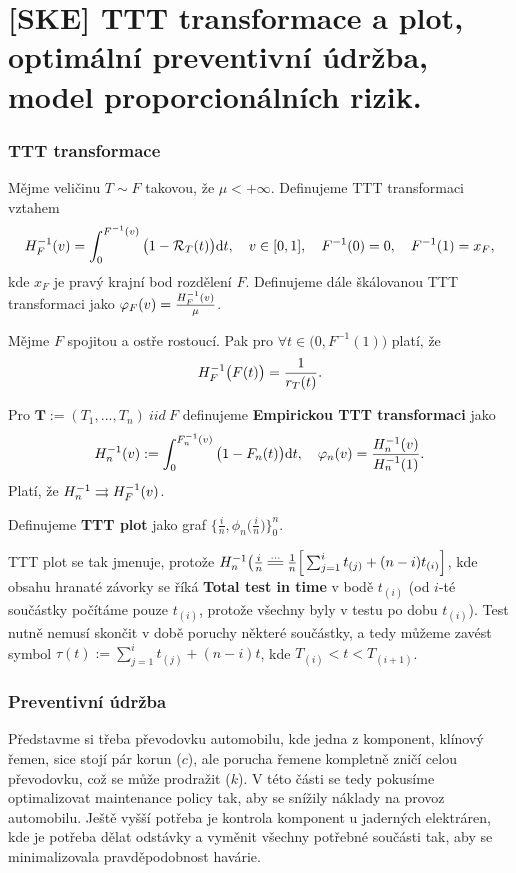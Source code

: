 \chapter{[SKE] TTT transformace a plot, optimální preventivní údržba, model proporcionálních rizik.}

\subsection{TTT transformace}
\begin{define}
Mějme veličinu $T\sim F$ takovou, že $\mu<+\infty$. Definujeme TTT transformaci vztahem $$ H_F^{-1}(v)=\int_{0}^{F^{-1}(v)}\big(1-\mathcal{R}_T(t)\big)\mathrm{d} t,\quad v\in[0,1],\quad F^{-1}(0)=0,\quad F^{-1}(1)=x_F,$$
kde $x_F$ je pravý krajní bod rozdělení $F$. Definujeme dále škálovanou TTT transformaci jako $\varphi_F(v)=\frac{H_F^{-1}(v)}{\mu}$.
\end{define}


\begin{theorem}
Mějme $F$ spojitou a ostře rostoucí. Pak pro $\forall t\in\big(0,F^{-1}(1)\big)$ platí, že $$H_F^{-1}\big(F(t)\big)=\frac{1}{r_T(t)}.$$
\end{theorem}

\begin{define}
	Pro $\textbf{T}:=(T_1,...,T_n)~iid~F$ definujeme \textbf{Empirickou TTT transformaci} jako
	$$ H_n^{-1}(v):=\int_{0}^{F_n^{-1}(v)}\big(1-F_n(t)\big)\mathrm{d} t,\quad \varphi_n(v)=\frac{H_n^{-1}(v)}{H_n^{-1}(1)}. $$
	Platí, že $H_n^{-1}\rightrightarrows H_F^{-1}(v)$.
\end{define}

\begin{define}
	Definujeme \textbf{TTT plot} jako graf $\Big\{\frac{i}{n},\phi_n\big(\frac{i}{n}\big)\Big\}_0^n$.
\end{define}

TTT plot se tak jmenuje, protože $\inv{H_n}\big(\frac{i}{n}\equal{...}\frac{1}{n}\Big[\sum_{j=1}^i t_{(j)}+(n-i)t_{(i)}\Big]$, kde obsahu hranaté závorky se říká \textbf{Total test in time} v bodě $t_{(i)}$ (od $i$-té součástky počítáme pouze $t_{(i)}$, protože všechny byly v testu po dobu $t_{(i)}$). Test nutně nemusí skončit v době poruchy některé součástky, a tedy můžeme zavést symbol $\tau(t):=\sum_{j=1}^it_{(j)}+(n-i)t$, kde $T_{(i)}<t<T_{(i+1)}$.

\subsection{Preventivní údržba}
Představme si třeba převodovku automobilu, kde jedna z komponent, klínový řemen, sice stojí pár korun ($c$), ale porucha řemene kompletně zničí celou převodovku, což se může prodražit ($k$). V této části se tedy pokusíme optimalizovat maintenance policy tak, aby se snížily náklady na provoz automobilu. Ještě vyšší potřeba je kontrola komponent u jaderných elektráren, kde je potřeba dělat odstávky a vyměnit všechny potřebné součásti tak, aby se minimalizovala pravděpodobnost havárie.

